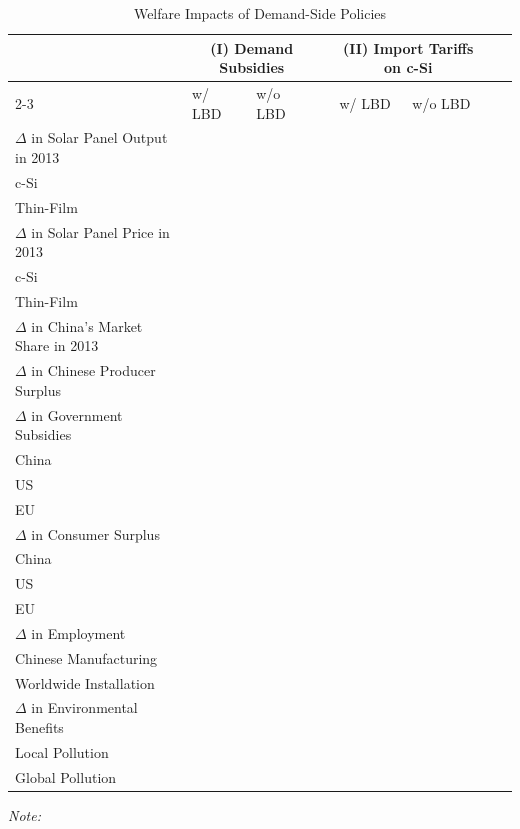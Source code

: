 \documentclass[12pt, letter]{article}
\begin{document}
\begin{table}[tbh]
\centering
\caption{Welfare Impacts of Demand-Side Policies}
\label{tab:cf_demand_policy}
\begin{threeparttable}
\begin{tabularx}{1.0\textwidth}{Xlllllll}
\toprule
 & \multicolumn{2}{c}{(I) Demand Subsidies } && \multicolumn{2}{c}{(II) Import Tariffs on c-Si } \\
\cmidrule{2-3} \cmidrule{5-6}
 & w/ LBD & w/o LBD && w/ LBD & w/o LBD \\
\midrule
$\Delta$ in Solar Panel Output in 2013 &  &  &&  &  \\
\quad\quad c-Si &  &  &&  &  \\
\quad\quad Thin-Film &  &  &&  &  \\
$\Delta$ in Solar Panel Price in 2013 &  &  &&  &  \\
\quad\quad c-Si &  &  &&  &  \\
\quad\quad Thin-Film &  &  &&  &  \\
$\Delta$ in China's Market Share in 2013 &  &  &&  &  \\
$\Delta$ in Chinese Producer Surplus &  &  &&  &  \\
$\Delta$ in Government Subsidies &  &  &&  &  \\
\quad\quad China &  &  &&  &  \\
\quad\quad US &  &  &&  &  \\
\quad\quad EU &  &  &&  &  \\
$\Delta$ in Consumer Surplus &  &  &&  &  \\
\quad\quad China &  &  &&  &  \\
\quad\quad US &  &  &&  &  \\
\quad\quad EU &  &  &&  &  \\
$\Delta$ in Employment &  &  &&  &  \\
\quad\quad Chinese Manufacturing & &   &&  &  \\
\quad\quad Worldwide Installation & &   &&  &  \\
$\Delta$ in Environmental Benefits &  &  &&  &  \\
\quad\quad Local Pollution & &  &&  &  \\
\quad\quad Global Pollution & &  &&  &  \\
\bottomrule
\end{tabularx}
\begin{tablenotes}
  \item \textit{Note:} 
\end{tablenotes}
\end{threeparttable}
\end{table}
\end{document}
